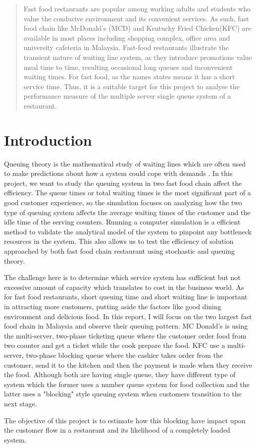 
\begin{abstract}

	Fast food restaurants are popular among working adults and students who value the conducive environment and its convenient services. As such, fast food chain like McDonald's (MCD) and Kentucky Fried Chicken(KFC) are available in most places including shopping complex, office area and university cafeteria in Malaysia. Fast-food restaurants illustrate the transient nature of waiting line system, as they introduce promotions value meal time to time, resulting occasional long queues and inconvenient waiting times. For fast food, as the names states means it has a short service time. Thus, it is a suitable target for this project to analyse the performance measure of the multiple server single queue system of a restaurant.

\end{abstract}

\section{Introduction}
Queuing theory is the mathematical study of waiting lines which are often used to make predictions about how a system could cope with demands \cite{adan2002queueing}. In this project, we want to study the queuing system in two fast food chain affect the efficiency.
The queue times or total waiting times is the most significant part of a good customer experience\cite{ROY201629}, so the simulation focuses on analyzing how the two type of queuing system affects the average waiting times of the customer and the idle time of the serving counters.
Running a computer simulation is a efficient method to validate the analytical model of the system to pinpoint any bottleneck resources in the system. This also allows us to test the efficiency of solution approached by both fast food chain restaurant using stochastic and queuing theory.

The challenge here is to determine which service system has sufficient but not excessive amount of capacity which translates to cost in the business world. As for fast food restaurants, short queuing time and short waiting line is important in attracting more customers, putting aside the factors like good dining environment and delicious food\cite{dharmawirya2012analysis}. In this report, I will focus on the two largest fast food chain in Malaysia \cite{abdullah2015trend} and observe their queuing pattern. MC Donald's is using the multi-server, two-phase ticketing queue where the customer order food from two counter and get a ticket while the cook prepare the food\cite{Kohimprovemcd}. KFC use a multi-server, two-phase blocking queue where the cashier takes order from the customer, send it to the kitchen and then the payment is made when they receive the food. Although both are having single queue, they have different type of system which the former uses a number queue system for food collection and the latter uses a "blocking" style queuing system when customers transition to the next stage.

The objective of this project is to estimate how this blocking have impact upon the customer flow in a restaurant and its likelihood of a completely loaded system.
